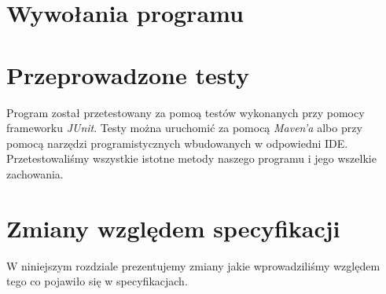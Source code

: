 \documentclass[10pt, a4paper]{report}
\begin{document}
\newpage

\section{Wywołania programu}\label{sec:wywołania-programu}


\section{Przeprowadzone testy}\label{sec:przeprowadzone-testy}
Program został przetestowany za pomoą testów wykonanych przy pomocy frameworku \textit{JUnit}. Testy można uruchomić za pomocą \textit{Maven'a} albo przy pomocą narzędzi programistycznych wbudowanych w odpowiedni IDE.
Przetestowaliśmy wszystkie istotne metody naszego programu i jego wszelkie zachowania.

\section{Zmiany względem specyfikacji}\label{sec:zmiany-względem-specyfikacji}
W niniejszym rozdziale prezentujemy zmiany jakie wprowadziliśmy względem tego co pojawiło się w specyfikacjach.
\end{document}
